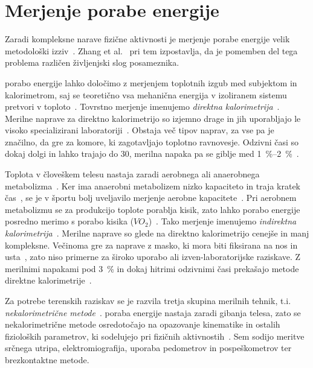 \section{Merjenje porabe energije}\label{sec:merjenje}
Zaradi kompleksne narave fizične aktivnosti je merjenje porabe energije velik metodološki izziv~\cite{zhang2004improving}. Zhang et al.~\cite{zhang2004improving} pri tem izpostavlja, da je pomemben del tega problema različen življenjski slog posameznika. 

porabo energije lahko določimo z merjenjem toplotnih izgub med subjektom in kalorimetrom, saj se teoretično vsa mehanična energija v izoliranem sistemu pretvori v toploto~\cite{levine2005measurement}. Tovrstno merjenje imenujemo \emph{direktna kalorimetrija}~\cite{levine2005measurement}. Merilne naprave za direktno kalorimetrijo so izjemno drage in jih uporabljajo le visoko specializirani laboratoriji~\cite{levine2005measurement}. Obstaja več tipov naprav, za vse pa je značilno, da gre za komore, ki zagotavljajo toplotno ravnovesje. Odzivni časi so dokaj dolgi in lahko trajajo do \SI{30}{\min}, merilna napaka pa se giblje med \hbox{\SIrange{1}{2}{\%}}~\cite{levine2005measurement}.

Toplota v človeškem telesu nastaja zaradi aerobnega ali anaerobnega metabolizma~\cite{scott2005misconceptions}. Ker ima anaerobni metabolizem nizko kapaciteto in traja kratek čas~\cite{sahlin1998energy}, se je v športu bolj uveljavilo merjenje aerobne kapacitete~\cite{scott2005misconceptions,howley1995criteria}. Pri aerobnem metabolizmu se za produkcijo toplote porablja kisik, zato lahko porabo energije posredno merimo s porabo kisika (${VO}_2$)~\cite{scott2005misconceptions}. Tako merjenje imenujemo \emph{indirektna kalorimetrija}~\cite{levine2005measurement}. Merilne naprave so glede na direktno kalorimetrijo cenejše in manj kompleksne. Večinoma gre za naprave z masko, ki mora biti fiksirana na nos in usta~\cite{levine2005measurement}, zato niso primerne za široko uporabo ali izven-laboratorijske raziskave. Z merilnimi napakami pod \SI{3}{\%} in dokaj hitrimi odzivnimi časi prekašajo metode direktne kalorimetrije~\cite{levine2005measurement}.

Za potrebe terenskih raziskav se je razvila tretja skupina merilnih tehnik, t.i. \emph{nekalorimetrične metode}~\cite{levine2005measurement}. poraba energije nastaja zaradi gibanja telesa, zato se nekalorimetrične metode osredotočajo na opazovanje kinematike in ostalih fizioloških parametrov, ki sodelujejo pri fizičnih aktivnostih~\cite{levine2005measurement}. Sem sodijo meritve srčnega utripa, elektromiografija, uporaba pedometrov in pospeškometrov ter brezkontaktne metode.

